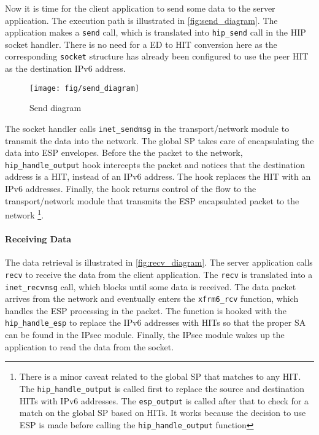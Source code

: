 Now it is time for the client application to send some data to the
server application. The execution path is illustrated in
\autoref{fig:send_diagram}. The application makes a \verb|send| call,
which is translated into \verb|hip_send| call in the HIP socket
handler. There is no need for a ED to HIT conversion here as the
corresponding \verb|socket| structure has already been configured to
use the peer HIT as the destination IPv6 address.

\begin{figure}[htb]
\begin{center}
\texttt{[image: fig/send\_diagram]}
\end{center}
\caption{Send diagram}
\label{fig:send_diagram}
\end{figure}

The socket handler calls \verb|inet_sendmsg| in the transport/network
module to transmit the data into the network. The global SP takes care
of encapsulating the data into ESP envelopes. Before the the packet to
the network, \verb|hip_handle_output| hook intercepts the packet and
notices that the destination address is a HIT, instead of an IPv6
address. The hook replaces the HIT with an IPv6 addresses. Finally,
the hook returns control of the flow to the transport/network module
that transmits the ESP encapsulated packet to the network
\footnote{There is a minor caveat related to the global SP that
matches to any HIT. The \texttt{hip\_handle\_output} is called first
to replace the source and destination HITs with IPv6 addresses. The
\texttt{esp\_output} is called after that to check for a match on the
global SP based on HITs. It works because the decision to use ESP is
made before calling the \texttt{hip\_handle\_output} function}.

\paragraph{Receiving Data}

The data retrieval is illustrated in \autoref{fig:recv_diagram}.  The
server application calls \verb|recv| to receive the data from the
client application. The \verb|recv| is translated into a
\verb|inet_recvmsg| call, which blocks until some data is
received. The data packet arrives from the network and eventually
enters the \verb|xfrm6_rcv| function, which handles the ESP processing
in the packet. The function is hooked with the \verb|hip_handle_esp|
to replace the IPv6 addresses with HITs so that the proper SA can be
found in the IPsec module. Finally, the IPsec module wakes up the
application to read the data from the socket.

